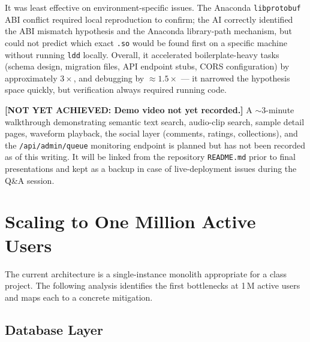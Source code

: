 \documentclass[12pt,letterpaper]{report}
\begin{document}
It was least effective on environment-specific issues. The Anaconda \texttt{libprotobuf} ABI conflict required local reproduction to confirm; the AI correctly identified the ABI mismatch hypothesis and the Anaconda library-path mechanism, but could not predict which exact \texttt{.so} would be found first on a specific machine without running \texttt{ldd} locally. Overall, it accelerated boilerplate-heavy tasks (schema design, migration files, API endpoint stubs, CORS configuration) by approximately $3\times$, and debugging by $\approx 1.5\times$ --- it narrowed the hypothesis space quickly, but verification always required running code.

\begin{warningbox}
  \textbf{[NOT YET ACHIEVED: Demo video not yet recorded.]}
  A $\sim$3-minute walkthrough demonstrating semantic text search, audio-clip search,
  sample detail pages, waveform playback, the social layer (comments, ratings,
  collections), and the \texttt{/api/admin/queue} monitoring endpoint is planned but
  has not been recorded as of this writing. It will be linked from the repository
  \texttt{README.md} prior to final presentations and kept as a backup in case of
  live-deployment issues during the Q\&A session.
\end{warningbox}

\chapter{Scaling to One Million Active Users}

The current architecture is a single-instance monolith appropriate for a class project. The following analysis identifies the first bottlenecks at 1\,M active users and maps each to a concrete mitigation.

\section{Database Layer}
\end{document}
